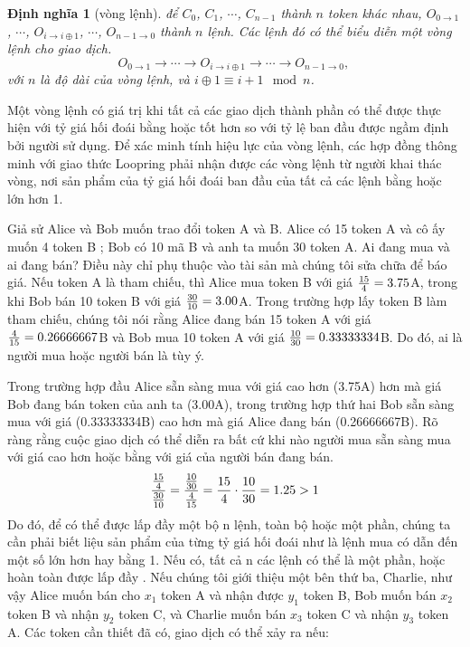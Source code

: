 \documentclass[12pt,a4paper]{article}
\newtheorem{definition}{Định nghĩa}[section]
\begin{document}
\begin{multicols}{2}
\begin{definition}[vòng lệnh] để $C_{0}$, $C_{1}$, $\cdots$, $C_{n-1}$ thành  $n$  token khác nhau,   $O_{0\rightarrow 1}$, $\cdots$, $O_{i\rightarrow i\oplus 1}$, $\cdots$, $O_{n-1 \rightarrow 0}$ thành $n$ lệnh.  Các lệnh đó có thể biểu diễn một vòng lệnh cho giao dịch.
$$O_{0\rightarrow 1} \rightarrow \cdots \rightarrow O_{i\rightarrow i\oplus 1} \rightarrow \cdots \rightarrow O_{n-1\rightarrow 0} \text{, }$$
với $n$ là độ dài của vòng lệnh, và $i\oplus 1 \equiv i+1 \mod n$.
\end{definition}

Một vòng lệnh có giá trị khi tất cả các giao dịch thành phần có thể được thực hiện với tỷ giá hối đoái bằng hoặc tốt hơn so với tỷ lệ ban đầu được ngầm định bởi người sử dụng. Để xác minh tính hiệu lực của vòng lệnh, các hợp đồng thông minh với giao thức Loopring phải nhận được các vòng lệnh từ người khai thác vòng, nơi sản phẩm của tỷ giá hối đoái ban đầu của tất cả các lệnh bằng hoặc lớn hơn 1.

Giả sử Alice và Bob muốn trao đổi token  A và B. Alice có 15 token  A và cô ấy muốn 4 token B ; Bob có 10 mã B và anh ta muốn 30 token A.
Ai đang mua và ai đang bán? Điều này chỉ phụ thuộc vào tài sản mà chúng tôi sửa chữa để báo giá. Nếu token A là tham chiếu, thì Alice mua token B với giá ${15 \over 4} = 3.75$A, trong khi Bob bán 10 token B với giá ${30 \over 10} = 3.00$A. Trong trường hợp lấy token B làm tham chiếu, chúng tôi nói rằng Alice đang bán 15 token A với giá ${4\over 15}=0.26666667$B và Bob mua 10 token A với giá ${10 \over 30}=0.33333334$B. Do đó, ai là người mua hoặc người bán là tùy ý.

Trong trường hợp đầu Alice sẵn sàng mua với giá cao hơn (3.75A) hơn mà giá Bob đang bán token của anh ta (3.00A), trong trường hợp thứ hai Bob sẵn sàng mua với giá (0.33333334B) cao hơn mà giá Alice đang bán (0.26666667B).  Rõ ràng rằng cuộc giao dịch có thể diễn ra bất cứ khi nào người mua sẵn sàng mua với giá cao hơn hoặc bằng với giá của người bán đang bán.
\begin{equation}
{{15\over 4} \over {30\over 10}} = {{10\over 30} \over {4\over 15}}={15 \over 4} \cdot {10 \over 30} = 1.25 > 1
\end{equation}
Do đó, để có thể được lấp đầy một bộ n lệnh, toàn bộ hoặc một phần, chúng ta cần phải biết liệu sản phẩm của từng tỷ giá hối đoái như là lệnh mua có dẫn đến một số lớn hơn hay bằng 1. Nếu có, tất cả n các lệnh có thể là một phần, hoặc hoàn toàn được lấp đầy \cite{bancor}.
Nếu chúng tôi giới thiệu một bên thứ ba, Charlie, như vậy Alice muốn bán cho $x_1$ token A và nhận được $y_1$ token B, Bob muốn bán $x_2$ token B và nhận $y_2$ token C, và Charlie muốn bán $x_3$ token C và nhận $y_3$ token A. Các token cần thiết đã có, giao dịch có thể xảy ra nếu:


\end{multicols}
\end{document}
